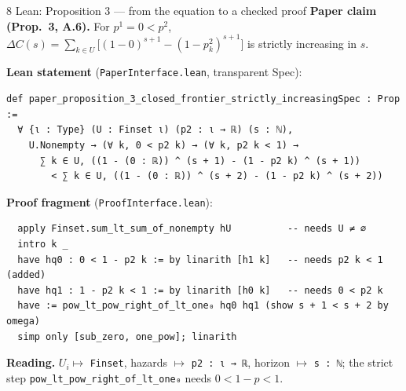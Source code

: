 \documentclass[aspectratio=169,11pt]{beamer}
\begin{document}
\begin{frame}[fragile]{8 \textperiodcentered{} Lean: Proposition 3 --- from the equation to a checked proof}
  \small\textbf{Paper claim (Prop.\ 3, A.6).} For $p^1=0<p^2$,\;
  $\Delta C(s)=\sum_{k\in U}\big[(1-0)^{s+1}-(1-p^2_k)^{s+1}\big]$ is strictly increasing in $s$.

  \smallskip
  \textbf{Lean statement} (\texttt{PaperInterface.lean}, transparent Spec):
\begin{lstlisting}
def paper_proposition_3_closed_frontier_strictly_increasingSpec : Prop :=
  ∀ {ι : Type} (U : Finset ι) (p2 : ι → ℝ) (s : ℕ),
    U.Nonempty → (∀ k, 0 < p2 k) → (∀ k, p2 k < 1) →
      ∑ k ∈ U, ((1 - (0 : ℝ)) ^ (s + 1) - (1 - p2 k) ^ (s + 1))
        < ∑ k ∈ U, ((1 - (0 : ℝ)) ^ (s + 2) - (1 - p2 k) ^ (s + 2))
\end{lstlisting}
  \textbf{Proof fragment} (\texttt{ProofInterface.lean}):
\begin{lstlisting}
  apply Finset.sum_lt_sum_of_nonempty hU          -- needs U ≠ ∅
  intro k _
  have hq0 : 0 < 1 - p2 k := by linarith [h1 k]   -- needs p2 k < 1 (added)
  have hq1 : 1 - p2 k < 1 := by linarith [h0 k]   -- needs 0 < p2 k
  have := pow_lt_pow_right_of_lt_one₀ hq0 hq1 (show s + 1 < s + 2 by omega)
  simp only [sub_zero, one_pow]; linarith
\end{lstlisting}
  \textbf{Reading.} $U_i\mapsto$ \texttt{Finset}, hazards $\mapsto$ \texttt{p2 : ι → ℝ}, horizon $\mapsto$
  \texttt{s : ℕ}; the strict step \texttt{pow\_lt\_pow\_right\_of\_lt\_one₀} needs $0<1-p<1$.
\end{frame}
\end{document}
